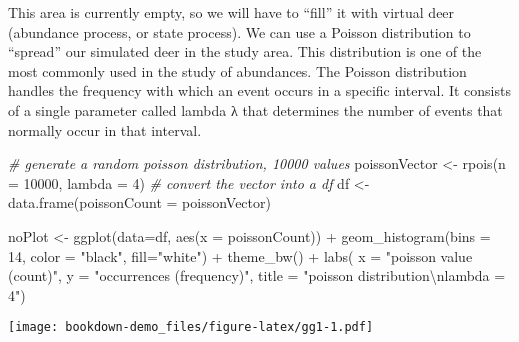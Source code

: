 \documentclass[
]{book}
\newenvironment{Shaded}{\begin{snugshade}}{\end{snugshade}}
\newcommand{\AttributeTok}[1]{\textcolor[rgb]{0.77,0.63,0.00}{#1}}
\newcommand{\CommentTok}[1]{\textcolor[rgb]{0.56,0.35,0.01}{\textit{#1}}}
\newcommand{\DecValTok}[1]{\textcolor[rgb]{0.00,0.00,0.81}{#1}}
\newcommand{\FunctionTok}[1]{\textcolor[rgb]{0.00,0.00,0.00}{#1}}
\newcommand{\NormalTok}[1]{#1}
\newcommand{\OtherTok}[1]{\textcolor[rgb]{0.56,0.35,0.01}{#1}}
\newcommand{\SpecialCharTok}[1]{\textcolor[rgb]{0.00,0.00,0.00}{#1}}
\newcommand{\StringTok}[1]{\textcolor[rgb]{0.31,0.60,0.02}{#1}}
\begin{document}
\begin{col}{0.45\textwidth}
This area is currently empty, so we will have to ``fill'' it with virtual deer (abundance process, or state process). We can use a Poisson distribution to ``spread'' our simulated deer in the study area. This distribution is one of the most commonly used in the study of abundances. The Poisson distribution handles the frequency with which an event occurs in a specific interval. It consists of a single parameter called lambda λ that determines the number of events that normally occur in that interval.

\end{col}

\begin{Shaded}
\begin{Highlighting}[]
\CommentTok{\# generate a random poisson distribution, 10000 values}
\NormalTok{poissonVector }\OtherTok{\textless{}{-}} \FunctionTok{rpois}\NormalTok{(}\AttributeTok{n =} \DecValTok{10000}\NormalTok{, }\AttributeTok{lambda =} \DecValTok{4}\NormalTok{)}
\CommentTok{\# convert the vector into a df}
\NormalTok{df }\OtherTok{\textless{}{-}} \FunctionTok{data.frame}\NormalTok{(}\AttributeTok{poissonCount =}\NormalTok{ poissonVector)}

\NormalTok{noPlot }\OtherTok{\textless{}{-}} \FunctionTok{ggplot}\NormalTok{(}\AttributeTok{data=}\NormalTok{df, }\FunctionTok{aes}\NormalTok{(}\AttributeTok{x =}\NormalTok{ poissonCount)) }\SpecialCharTok{+}
  \FunctionTok{geom\_histogram}\NormalTok{(}\AttributeTok{bins =} \DecValTok{14}\NormalTok{, }\AttributeTok{color =} \StringTok{"black"}\NormalTok{, }\AttributeTok{fill=}\StringTok{"white"}\NormalTok{) }\SpecialCharTok{+}
  \FunctionTok{theme\_bw}\NormalTok{() }\SpecialCharTok{+}
  \FunctionTok{labs}\NormalTok{( }\AttributeTok{x =} \StringTok{"poisson value (count)"}\NormalTok{, }
        \AttributeTok{y =} \StringTok{"occurrences (frequency)"}\NormalTok{, }
        \AttributeTok{title =} \StringTok{"poisson distribution}\SpecialCharTok{\textbackslash{}n}\StringTok{lambda = 4"}\NormalTok{)}
\end{Highlighting}
\end{Shaded}

\begin{col}{0.45\textwidth}
\texttt{[image: bookdown-demo\_files/figure-latex/gg1-1.pdf]}

\end{col}

\begin{col}{0.05\textwidth}
~

\end{col}
\end{document}
